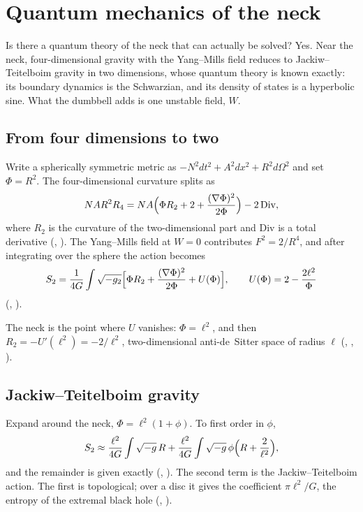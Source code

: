 \chapter{Quantum mechanics of the neck}\label{ch:jt}

\begin{questionbox}
Is there a quantum theory of the neck that can actually be solved? Yes. Near the neck, four-dimensional gravity with the Yang--Mills field reduces to Jackiw--Teitelboim gravity in two dimensions, whose quantum theory is known exactly: its boundary dynamics is the Schwarzian, and its density of states is a hyperbolic sine. What the dumbbell adds is one unstable field, $W$.
\end{questionbox}

\section{From four dimensions to two}

Write a spherically symmetric metric as $-N^2dt^2+A^2dx^2+R^2d\Omega^2$ and set $\Phi=R^2$. The four-dimensional curvature splits as
\[
NAR^2R_4=NA\Bigl(\Phi R_2+2+\frac{(\nabla\Phi)^2}{2\Phi}\Bigr)-2\,\mathrm{Div},
\]
where $R_2$ is the curvature of the two-dimensional part and Div is a total derivative (, ). The Yang--Mills field at $W=0$ contributes $F^2=2/R^4$, and after integrating over the sphere the action becomes
\[
S_2=\frac1{4G}\int\sqrt{-g_2}\Bigl[\Phi R_2+\frac{(\nabla\Phi)^2}{2\Phi}+U(\Phi)\Bigr],\qquad U(\Phi)=2-\frac{2\ell^2}\Phi
\]
(, ).

The neck is the point where $U$ vanishes: $\Phi=\ell^2$, and then $R_2=-U'(\ell^2)=-2/\ell^2$, two-dimensional anti-de~Sitter space of radius $\ell$ (, , ).

\section{Jackiw--Teitelboim gravity}

Expand around the neck, $\Phi=\ell^2(1+\phi)$. To first order in $\phi$,
\[
S_2\approx\frac{\ell^2}{4G}\int\sqrt{-g}\,R+\frac{\ell^2}{4G}\int\sqrt{-g}\,\phi\Bigl(R+\frac2{\ell^2}\Bigr),
\]
and the remainder is given exactly (, ). The second term is the Jackiw--Teitelboim action. The first is topological; over a disc it gives the coefficient $\pi\ell^2/G$, the entropy of the extremal black hole (, ).

